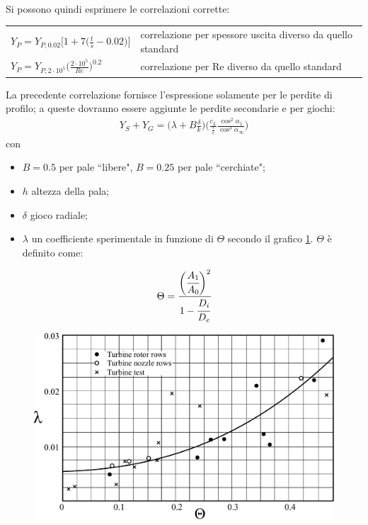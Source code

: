 \\Si possono quindi esprimere le correlazioni corrette:\\
\begin{tabular}{l l}
	$ Y_P = Y_{P,0.02} \bigg[ 1 + 7 \bigg( \frac{t}{s} - 0.02 \bigg) \bigg] $ & correlazione per spessore uscita diverso da quello standard\\
	$ Y_P = Y_{P,2 \cdot 10^5} \bigg( \frac{2 \cdot 10^5}{Re} \bigg)^{0.2} $ &  correlazione per Re diverso da quello standard\\
\end{tabular}

\vspace{0.5cm}
La precedente correlazione fornisce l'espressione solamente per le perdite di profilo; a queste dovranno essere aggiunte le perdite secondarie e per giochi:
\begin{align*}
Y_S + Y_G = \Big( \lambda + B \frac{\delta}{k} \Big) \Bigg( \frac{c_L}{\frac{s}{c}} \frac{\cos^2 \alpha_1}{\cos^3 \alpha_{\infty}} \Bigg)
\end{align*}
con
\begin{itemize}
\item $B = 0.5$ per pale ``libere", $B = 0.25$ per pale ``cerchiate";
\item $h$ altezza della pala;
\item $\delta$ gioco radiale;
\item $\lambda$ un coefficiente sperimentale in funzione di $\Theta$ secondo il grafico \ref{fig:lambdaPerditeSchiera}. $\Theta$ è definito come:
\end{itemize}
\begin{align*}
\Theta = \cfrac{\bigg(\cfrac{A_1}{A_0}\bigg)^2}{1- \cfrac{D_i}{D_e}}
\end{align*}
\begin{figure}
\centering
  \includegraphics[width=.6\textwidth]{fig/lambdaPerditeSchiera.pdf}
\caption{}
\label{fig:lambdaPerditeSchiera}
\end{figure}

